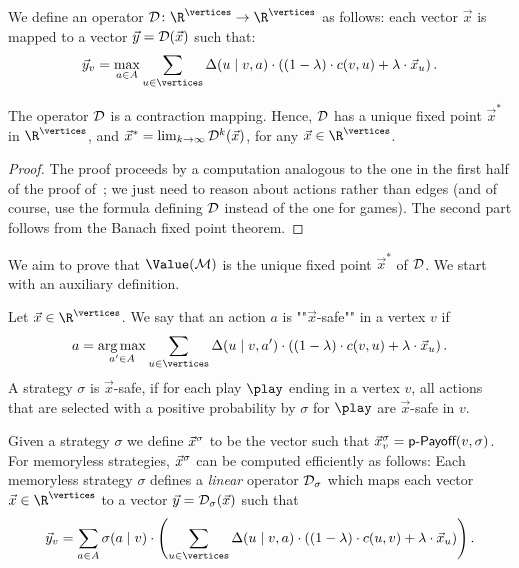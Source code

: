 We define an operator $\discOP\colon 
\R^{\vertices}\rightarrow \R^{\vertices}$ as follows: each vector $\vec{x}$ is mapped to a vector 
$\vec{y} = \mathcal{D}(\vec{x})$ such that:
$$
\vec{y}_v = \max_{a \in \actions} \sum_{u\in \vertices} \probTranFunc(u\mid 
v,a) 
\cdot\left((1-\lambda)\cdot\colouring(v,u) + \lambda\cdot \vec{x}_u \right).
$$

\begin{lemma}
\label{5-lem:fixpoint}
The operator $\mathcal{D}$ is a contraction mapping. Hence, $\mathcal{D}$ has a unique 
fixed point $\vec{x}^*$ in $\R^{\vertices}$, and $\vec{x}^* = 
\lim_{k\rightarrow \infty} \mathcal{D}^k(\vec{x})$, for any 
$\vec{x}\in\R^{\vertices}$.
\end{lemma}
\begin{proof}
The proof proceeds by a computation analogous to the one in the first half of 
the proof of~; we just need to reason about actions 
rather than edges (and of course, use the formula defining $\mathcal{D}$ instead of 
the one for games). The second part follows from the Banach fixed point theorem.
\end{proof}

We aim to prove that $\Value(\mdp)$ is the unique fixed point $\vec{x}^*$ of 
$\mathcal{D}$. We start with an auxiliary definition.

\begin{definition}
\label{5-def:disc-safe-act}
Let $\vec{x}\in \R^{\vertices}$. We say that an action $a$ is ""$\vec{x}$-safe"" in 
a vertex $v$ if
\begin{equation}
\label{5-eq:disc-safe-act}
a= \underset{a' \in \actions}{\arg\max} \sum_{u\in \vertices} 
\probTranFunc(u\mid 
v,a') 
\cdot\left((1-\lambda)\cdot\colouring(v,u) + \lambda\cdot \vec{x}_u \right).
\end{equation}
\noindent
A strategy $\sigma$ is $\vec{x}$-safe, if for 
each play $ \play $ ending in a vertex $v$, all actions that are selected with a positive 
probability by $\sigma$ for $\play$ are $\vec{x}$-safe in $v$.
\end{definition}


Given a strategy $\sigma$ we define $\vec{x}^{\sigma}$ to be the vector such that $\vec{x}_{v}^\sigma = 
\textsf{p-Payoff}(v,\sigma)$. For memoryless strategies, $\vec{x}^{\sigma}$ can be computed efficiently as follows:
Each memoryless strategy $\sigma$ defines a \emph{linear} operator $\mathcal{D}_{\sigma}$ which maps each vector 
$\vec{x}\in \R^{\vertices}$ to a vector $\vec{y}=\mathcal{D}_{\sigma}(\vec{x})$ 
such that $$\vec{y}_v = \sum_{a\in \actions} \sigma(a\mid v) \cdot 
\left(\sum_{u \in \vertices} 
\probTranFunc(u \mid v,a) \cdot( (1-\lambda)\cdot \colouring(u,v) + 
\lambda \cdot \vec{x}_u )\right).$$  

